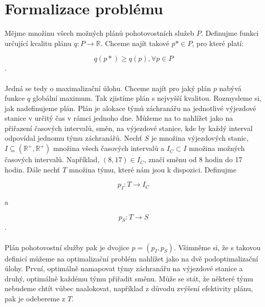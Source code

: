 \clearpage

\section{Formalizace problému}

Mějme množinu všech možných plánů pohotovostních služeb $P$. Definujme funkci určující kvalitu plánu $q\colon P \rightarrow \mathbb{R}$.
Chceme najít takové $p* \in P$, pro které platí:

$$
q(p*) \geq q(p), \forall p \in P
$$
.
\\
\\
Jedná se tedy o maximalizační úlohu. Chceme najít pro jaký plán $p$ nabývá funkce $q$ globální maximum. Tak zjistíme plán s nejvyšší kvalitou.
Rozmysleme si, jak nadefinujeme plán. Plán je alokace týmů záchranářu na jednotlivé výjezdové stanice v určitý čas v rámci jednoho dne.
Můžeme na to nahlížet jako na přiřazení časových intervalů, směn, na výjezdové stanice, kde by každý interval odpovídal jednomu týmu záchranářů.
Nechť $S$ je množina výjezdových stanic, $I \subseteq (\mathbb{R^+}, \mathbb{R^+})$ množina všech časových intervalů a $I_C \subset I$ množina možných časových intervalů.
Například, $(8, 17) \in I_C$, značí směnu od 8 hodin do 17 hodin.
Dále nechť $T$ množina týmu, které nám jsou k dispozici. Definujme

$$
p_I \colon T \rightarrow I_C
$$

a

$$
p_S \colon T \rightarrow S
$$
.
\\
\\
Plán pohotovostní služby pak je dvojice $p = (p_I, p_S)$.
Všimněme si, že s takovou definicí můžeme na optimalizační problém nahlížet jako na dvě podoptimalizační úlohy.
První, optimálně namapovat týmy záchranářu na výjezdové stanice a druhý, optimálně každému týmu přiřadit směnu.
Může se stát, že některé týmu nebudeme chtít vůbec naalokovat, například z důvodu zvýšení efektivity plánu, pak je odebereme z $T$.

